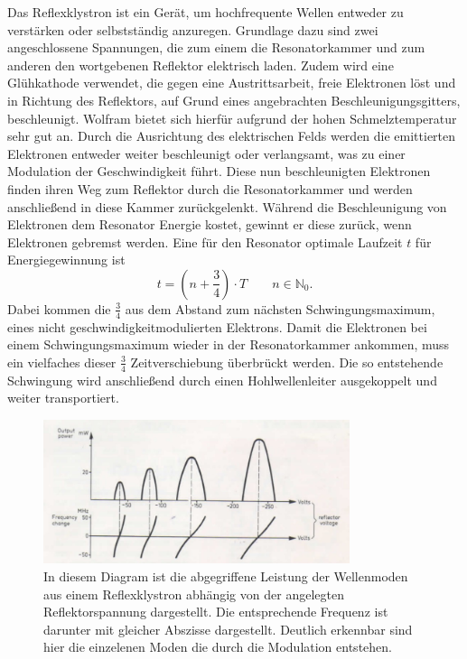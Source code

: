 Das Reflexklystron ist ein Gerät, um hochfrequente Wellen entweder zu verstärken oder selbstständig anzuregen. Grundlage dazu sind zwei angeschlossene Spannungen, 
die zum einem die Resonatorkammer und zum anderen den wortgebenen Reflektor elektrisch laden. Zudem wird eine Glühkathode verwendet, die  
gegen eine Austrittsarbeit, freie Elektronen löst und in Richtung des Reflektors, auf Grund eines angebrachten Beschleunigungsgitters, beschleunigt. Wolfram bietet sich hierfür aufgrund der hohen Schmelztemperatur sehr gut an.
Durch die Ausrichtung des elektrischen Felds werden die emittierten Elektronen entweder weiter beschleunigt oder 
verlangsamt, was zu einer Modulation der Geschwindigkeit führt. Diese nun beschleunigten Elektronen finden ihren Weg zum Reflektor durch die Resonatorkammer und werden anschließend in diese Kammer zurückgelenkt. 
Während die Beschleunigung von Elektronen dem Resonator Energie kostet, gewinnt er diese zurück, wenn Elektronen gebremst werden. 
Eine für den Resonator optimale Laufzeit $t$ für Energiegewinnung ist 
\begin{equation}
    \label{eqn:trash}
    t = \left(n+ \frac{3}{4} \right) \cdot T  \quad \quad n \in \mathbb{N}_0.
\end{equation}
Dabei kommen die $\frac{3}{4}$ aus dem Abstand zum nächsten Schwingungsmaximum, eines nicht geschwindigkeitmodulierten Elektrons. Damit die Elektronen bei einem Schwingungsmaximum wieder 
in der Resonatorkammer ankommen, muss ein vielfaches dieser $\frac{3}{4}$ Zeitverschiebung überbrückt werden.
Die so entstehende Schwingung wird anschließend durch einen Hohlwellenleiter ausgekoppelt und weiter transportiert.
\begin{figure}
    \centering
    \includegraphics[width=0.8\textwidth]{Bilder/dia.jpg}
    \caption{In diesem Diagram ist die abgegriffene Leistung der Wellenmoden aus einem Reflexklystron abhängig von der angelegten Reflektorspannung dargestellt.
    Die entsprechende Frequenz ist darunter mit gleicher Abszisse dargestellt. Deutlich erkennbar sind hier die einzelenen Moden die durch die Modulation entstehen.} 
    \label{fig:ref}
\end{figure}
